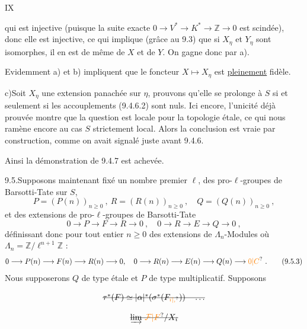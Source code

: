\hfill IX

qui est injective (puisque la suite exacte $0\longrightarrow V^*\longrightarrow K^*\longrightarrow\mathbb Z\longrightarrow0$ est scindée), donc elle est injective, ce qui implique (grâce au  9.3) que si $X_\eta$ et $Y_\eta$ sont isomorphes, il en est de même de $X$ et de $Y$. On gagne donc par a).

Evidemment a) et b) impliquent que le foncteur $X\longmapsto X_\eta$ est \uline{pleinement} fidèle.

c)\quad Soit $X_\eta$ une extension panachée sur $\eta$, prouvons qu'elle se prolonge à $S$ si et seulement si les accouplements (9.4.6.2) sont nuls. Ici encore, l'unicité déjà prouvée montre que la question est locale pour la topologie étale, ce qui nous\unsure{,} ramène encore au cas $S$ strictement local. Alors la conclusion est vraie par construction, comme on avait signalé juste avant 9.4.6.

Ainsi la démonstration de 9.4.7 est achevée.

9.5.\quad Supposons maintenant fixé un nombre premier $\ell$, des pro-$\ell$-groupes de Barsotti-Tate sur $S$,
\[
 P=(P(n))_{n\geq0}\ ,\ R=(R(n))_{n\geq0}\ ,\quad Q=(Q(n))_{n\geq0}\ ,\tag*{(9.5.1)}
\]
et des extensions de pro-$\ell$-groupes de Barsotti-Tate
\[
 0\longrightarrow P\longrightarrow F\longrightarrow R\longrightarrow0\ ,\quad
 0\longrightarrow R\longrightarrow E\longrightarrow Q\longrightarrow0\ ,\tag*{(9.5.2)}
\]
définissant donc pour tout entier $n\geq0$ des extensions de $\Lambda_n$-Modules où $\Lambda_n=\mathbb Z/\ell^{n+1}\mathbb Z$ :
\[
 0\longrightarrow P(n)\longrightarrow F(n)\longrightarrow R(n)\longrightarrow0,\quad
 0\longrightarrow R(n)\longrightarrow E(n)\longrightarrow Q(n)\longrightarrow\unsure{0|C}\ .\tag*{(9.5.3)}
\]
Nous supposerons $Q$ de type étale et $P$ de type multiplicatif. Supposons

\[
 \deleted{\tau^*(F)\simeq|\alpha|^*(\sigma^*(F_{\unsure{i|,}}))\quad\ldots}
\]

\[
 \deleted{\varinjlim\,\unsure{\mathcal F|F}/X_i}
\]

